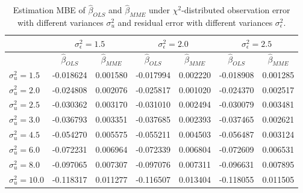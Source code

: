 \documentclass{article}
\begin{document}
\begin{table}[ht]
    \centering
    \caption{Estimation MBE of $\hat{\beta}_{OLS}$ and $\hat{\beta}_{MME}$ under $\chi^2$-distributed observation error with different variances $\sigma^2_u$ and residual error with different variances $\sigma^2_\epsilon$.}
    \label{Tab:MBE_chi}
    \begin{tabular}[t]{lcccccc}
        \hline
        &\multicolumn{2}{c}{$\sigma^2_\epsilon=1.5$}&\multicolumn{2}{c}{$\sigma^2_\epsilon=2.0$}&\multicolumn{2}{c}{$\sigma^2_\epsilon=2.5$}\\
        \hline
        &$\hat{\beta}_{OLS}$&$\hat{\beta}_{MME}$&$\hat{\beta}_{OLS}$&$\hat{\beta}_{MME}$&$\hat{\beta}_{OLS}$&$\hat{\beta}_{MME}$\\
        \hline
        $\sigma^2_u = 1.5$&-0.018624&0.001580&-0.017994&0.002220&-0.018908&0.001285\\
        $\sigma^2_u = 2.0$&-0.024808&0.002076&-0.025817&0.001020&-0.024370&0.002517\\
        $\sigma^2_u = 2.5$&-0.030362&0.003170&-0.031010&0.002494&-0.030079&0.003481\\
        $\sigma^2_u = 3.0$&-0.036793&0.003351&-0.037685&0.002393&-0.037465&0.002621\\
        $\sigma^2_u = 4.5$&-0.054270&0.005575&-0.055211&0.004503&-0.056487&0.003124\\
        $\sigma^2_u = 6.0$&-0.072231&0.006964&-0.072339&0.006804&-0.072609&0.006531\\
        $\sigma^2_u = 8.0$&-0.097065&0.007307&-0.097076&0.007311&-0.096631&0.007895\\
        $\sigma^2_u = 10.0$&-0.118317&0.011277&-0.116507&0.013404&-0.118055&0.011505\\
        \hline
    \end{tabular}
\end{table}
\end{document}
